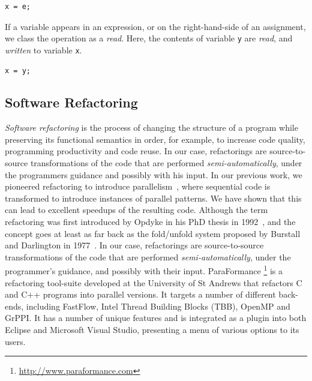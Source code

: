 \begin{lstlisting}
x = e;
\end{lstlisting}

\noindent
If a variable appears in an expression, or on the right-hand-side of an assignment, we class the operation as a \emph{read}. Here, the contents of variable \lstinline{y} are \emph{read}, and \emph{written} to variable \lstinline{x}.

\begin{lstlisting}
x = y;
\end{lstlisting}

\subsection{Software Refactoring}
\noindent
\emph{Software refactoring} is the process of changing the structure of a program while preserving
its functional semantics in order, for example, to increase code quality, programming
productivity and code reuse. In our case, refactorings are source-to-source transformations of the code that are performed \emph{semi-automatically}, under the programmers guidance and possibly with his input. In our previous work, we pioneered refactoring to introduce parallelism~\cite{rpl}, where sequential code is transformed to introduce instances of parallel patterns. We have shown that this can lead to excellent speedups of the resulting code. Although the term refactoring was first introduced by Opdyke in his PhD thesis in 1992~\cite{opdyke}, and the concept goes at least as far back as the fold/unfold system proposed by Burstall and Darlington in 1977~\cite{darlington77}. In our case, refactorings are source-to-source transformations of the code that are performed \emph{semi-automatically}, under the programmer's guidance, and possibly with their input. 
ParaFormance \footnote{\url{http://www.paraformance.com}} is a refactoring tool-suite developed at the University of St Andrews that refactors C and C++ programs into parallel versions. It targets a number of different back-ends, including FastFlow, Intel Thread Building Blocks (TBB), OpenMP and GrPPI. It has a number of unique features and is integrated as a plugin into both Eclipse and Microsoft Visual Studio, presenting a menu of various options to its users.





